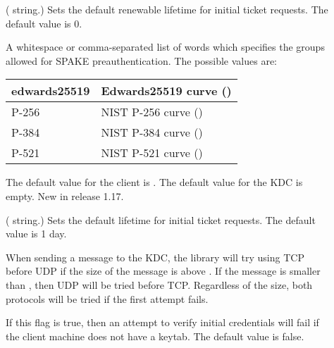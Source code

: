\documentclass[letterpaper,10pt,english]{sphinxmanual}
\begin{document}
\begin{description}
\item[{}] \leavevmode
( string.)  Sets the default renewable lifetime
for initial ticket requests.  The default value is 0.

\item[{}] \leavevmode
A whitespace or comma-separated list of words which specifies the
groups allowed for SPAKE preauthentication.  The possible values
are:


\begin{savenotes}\sphinxattablestart
\centering
\begin{tabulary}{\linewidth}[t]{|T|T|}
\hline

edwards25519
&
Edwards25519 curve ()
\\
\hline
P-256
&
NIST P-256 curve ()
\\
\hline
P-384
&
NIST P-384 curve ()
\\
\hline
P-521
&
NIST P-521 curve ()
\\
\hline
\end{tabulary}
\par
\sphinxattableend\end{savenotes}

The default value for the client is .  The default
value for the KDC is empty.  New in release 1.17.

\item[{}] \leavevmode
( string.)  Sets the default lifetime for initial
ticket requests.  The default value is 1 day.

\item[{}] \leavevmode
When sending a message to the KDC, the library will try using TCP
before UDP if the size of the message is above
.  If the message is smaller than
, then UDP will be tried before TCP.
Regardless of the size, both protocols will be tried if the first
attempt fails.

\item[{}] \leavevmode
If this flag is true, then an attempt to verify initial
credentials will fail if the client machine does not have a
keytab.  The default value is false.

\end{description}
\end{document}

